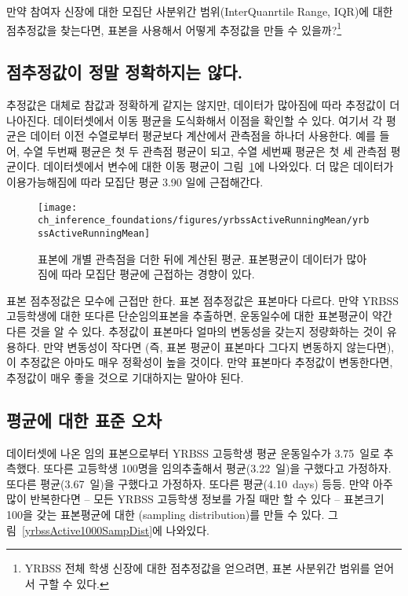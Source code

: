 \begin{exercise}
만약 참여자 신장에 대한 모집단 사분위간 범위(InterQuanrtile Range, IQR)에 대한 점추정값을 찾는다면, 표본을 사용해서 어떻게 추정값을 만들 수 있을까?\footnote{YRBSS 전체 학생 신장에 대한 점추정값을 얻으려면, 표본 사분위간 범위를 얻어서 구할 수 있다.}


\end{exercise}

\subsection{점추정값이 정말 정확하지는 않다.}

추정값은 대체로 참값과 정확하게 같지는 않지만, 데이터가 많아짐에 따라 추정값이 더 나아진다.  데이터셋에서 이동 평균을 도식화해서 이점을 확인할 수 있다. 여기서 각 평균은 데이터 이전 수열로부터 평균보다 계산에서 관측점을 하나더 사용한다. 예를 들어, 수열 두번째 평균은 첫 두 관측점 평균이 되고, 수열 세번째 평균은 첫 세 관측점 평균이다.  데이터셋에서  변수에 대한 이동 평균이 그림~\ref{yrbssActiveRunningMean}에 나와있다. 더 많은 데이터가 이용가능해짐에 따라 모집단 평균 3.90 일에 근접해간다. 

\begin{figure}[h]
   \centering
   \texttt{[image: ch\_inference\_foundations/figures/yrbssActiveRunningMean/yrbssActiveRunningMean]}
   \caption{표본에 개별 관측점을 더한 뒤에 계산된 평균. 표본평균이 데이터가 많아짐에 따라 모집단 평균에 근접하는 경향이 있다.}
   \label{yrbssActiveRunningMean}
\end{figure}

표본 점추정값은 모수에 근접만 한다. 표본 점추정값은 표본마다 다르다. 만약 YRBSS 고등학생에 대한 또다른 단순임의표본을 추출하면, 운동일수에 대한 표본평균이 약간 다른 것을 알 수 있다. 추정값이 표본마다 얼마의 변동성을 갖는지 정량화하는 것이 유용하다. 만약 변동성이 작다면 (즉, 표본 평균이 표본마다 그다지 변동하지 않는다면), 이 추정값은 아마도 매우 정확성이 높을 것이다. 만약 표본마다 추정값이 변동한다면, 추정값이 매우 좋을 것으로 기대하지는 말아야 된다.

\subsection{평균에 대한 표준 오차}
\label{seOfTheMean}

 데이터셋에 나온 임의 표본으로부터 YRBSS 고등학생 평균 운동일수가 3.75~일로 추측했다. 또다른 고등학생 100명을 임의추출해서 평균(3.22~일)을 구했다고 가정하자. 또다른 평균(3.67~일)을 구했다고 가정하자. 또다른 평균(4.10~days) 등등. 만약 아주 많이 반복한다면 -- 모든 YRBSS 고등학생 정보를 가질 때만 할 수 있다 -- 표본크기 100을 갖는 표본평균에 대한 (sampling distribution)를 만들 수 있다. 그림~\ref{yrbssActive1000SampDist}에 나와있다.

